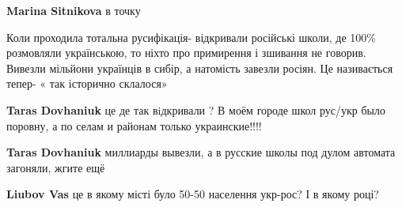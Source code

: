 \begin{itemize}
\begin{itemize}
 
\textbf{Marina Sitnikova} в точку
\end{itemize}

 

Коли проходила тотальна русифікація- відкривали російські школи, де 100\%
розмовляли українською, то ніхто про примирення і зшивання не говорив. Вивезли
мільйони українців в сибір, а натомість завезли росіян. Це називається тепер- «
так історично склалося»

\begin{itemize}
 
\textbf{Taras Dovhaniuk} це де так вiдкривали ? В моём городе школ рус/укр было поровну, а по селам и районам только украинские!!!!

 
\textbf{Taras Dovhaniuk} миллиарды вывезли, а в русские школы под дулом автомата загоняли, жгите ещё

 
\textbf{Liubov Vas} це в якому місті було 50-50 населення укр-рос? І в якому році?

 

\end{itemize}
\end{itemize}
